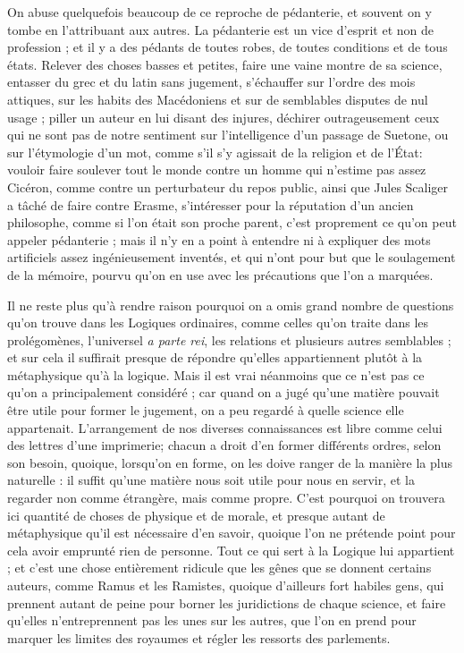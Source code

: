 On abuse quelquefois beaucoup de ce reproche de pédanterie, et souvent on y tombe en l'attribuant aux autres. La pédanterie est un vice d'esprit et non de profession ; et il y a des pédants de toutes robes, de toutes conditions et de tous états. Relever des choses basses et petites, faire une vaine montre de sa science, entasser du grec et du latin sans jugement, s'échauffer sur l'ordre des mois attiques, sur les habits des Macédoniens et sur de semblables disputes de nul usage ; piller un auteur en lui disant des injures, déchirer outrageusement ceux qui ne sont pas de notre sentiment sur l'intelligence d'un passage de Suetone, ou sur l'étymologie d'un mot, comme s'il s'y agissait de la religion et de l'État: vouloir faire soulever tout le monde contre un homme qui n'estime pas assez Cicéron, comme contre un perturbateur du repos public, ainsi que Jules Scaliger a tâché de faire contre Erasme, s'intéresser pour la réputation d'un ancien philosophe, comme si l'on était son proche parent, c'est proprement ce qu'on peut appeler pédanterie ; mais il n'y en a point à entendre ni à expliquer des mots artificiels assez ingénieusement inventés, et qui n'ont pour but que le soulagement de la mémoire, pourvu qu'on en use avec les précautions que l'on a marquées.

Il ne reste plus qu'à rendre raison pourquoi on a omis grand nombre de questions qu'on trouve dans les Logiques ordinaires, comme celles qu'on traite dans les prolégomènes, l'universel \emph{a parte rei}, les relations et plusieurs autres semblables ; et sur cela il suffirait presque de répondre qu'elles appartiennent plutôt à la métaphysique qu'à la logique. Mais il est vrai néanmoins que ce n'est pas ce qu'on a principalement considéré ; car quand on a jugé qu'une matière pouvait être utile pour former le jugement, on a peu regardé à quelle science elle appartenait. L'arrangement de nos diverses connaissances est libre comme celui des lettres d'une imprimerie; chacun a droit d'en former différents ordres, selon son besoin, quoique, lorsqu'on en forme, on les doive ranger de la manière la plus naturelle : il suffit qu'une matière nous soit utile pour nous en servir, et la regarder non comme étrangère, mais comme propre. C'est pourquoi on trouvera ici quantité de choses de physique et de morale, et presque autant de métaphysique qu'il est nécessaire d'en savoir, quoique l'on ne prétende point pour cela avoir emprunté rien de personne. Tout ce qui sert à la Logique lui appartient ; et c'est une chose entièrement ridicule que les gênes que se donnent certains auteurs, comme Ramus et les Ramistes, quoique d'ailleurs fort habiles gens, qui prennent autant de peine pour borner les juridictions de chaque science, et faire qu'elles n'entreprennent pas les unes sur les autres, que l'on en prend pour marquer les limites des royaumes et régler les ressorts des parlements.

